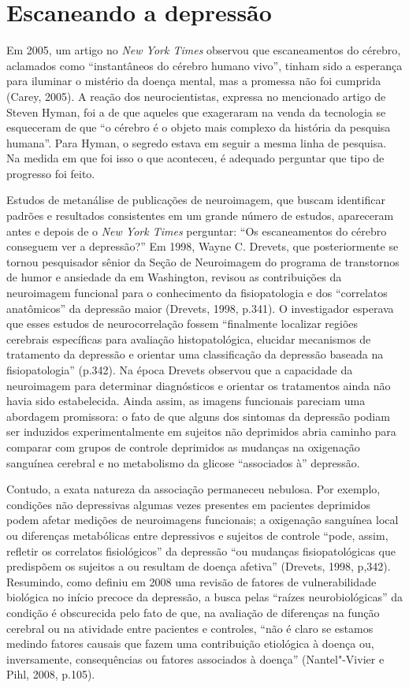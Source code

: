 \chapter{Escaneando a depressão}

Em 2005, um artigo no \emph{New York Times} observou que escaneamentos
do cérebro, aclamados como ``instantâneos do cérebro humano vivo'',
tinham sido a esperança para iluminar o mistério da doença mental, mas a
promessa não foi cumprida (Carey, 2005). A reação dos neurocientistas,
expressa no mencionado artigo de Steven Hyman, foi a de que aqueles que
exageraram na venda da tecnologia se esqueceram de que ``o cérebro é o
objeto mais complexo da história da pesquisa humana''. Para Hyman, o
segredo estava em seguir a mesma linha de pesquisa. Na medida em que foi
isso o que aconteceu, é adequado perguntar que tipo de progresso foi
feito.

Estudos de metanálise de publicações de neuroimagem, que buscam
identificar padrões e resultados consistentes em um grande número de
estudos, apareceram antes e depois de o \emph{New York Times} perguntar:
``Os escaneamentos do cérebro conseguem ver a depressão?'' Em 1998,
Wayne C. Drevets, que posteriormente se tornou pesquisador sênior da
Seção de Neuroimagem do programa de transtornos de humor e ansiedade da
 em Washington, revisou as contribuições da neuroimagem funcional
para o conhecimento da fisiopatologia e dos ``correlatos anatômicos'' da
depressão maior (Drevets, 1998, p.341). O investigador esperava que
esses estudos de neurocorrelação fossem ``finalmente localizar regiões
cerebrais específicas para avaliação histopatológica, elucidar
mecanismos de tratamento da depressão e orientar uma classificação da
depressão baseada na fisiopatologia'' (p.342). Na época Drevets observou
que a capacidade da neuroimagem para determinar diagnósticos e orientar
os tratamentos ainda não havia sido estabelecida. Ainda assim, as
imagens funcionais pareciam uma abordagem promissora: o fato de que
alguns dos sintomas da depressão podiam ser induzidos experimentalmente
em sujeitos não deprimidos abria caminho para comparar com grupos de
controle deprimidos as mudanças na oxigenação sanguínea cerebral e no
metabolismo da glicose ``associados à'' depressão.

Contudo, a exata natureza da associação permaneceu nebulosa. Por
exemplo, condições não depressivas algumas vezes presentes em pacientes
deprimidos podem afetar medições de neuroimagens funcionais; a
oxigenação sanguínea local ou diferenças metabólicas entre depressivos e
sujeitos de controle ``pode, assim, refletir os correlatos
fisiológicos'' da depressão ``ou mudanças fisiopatológicas que
predispõem os sujeitos a ou resultam de doença afetiva'' (Drevets, 1998,
p,342). Resumindo, como definiu em 2008 uma revisão de fatores de
vulnerabilidade biológica no início precoce da depressão, a busca pelas
``raízes neurobiológicas'' da condição é obscurecida pelo fato de que,
na avaliação de diferenças na função cerebral ou na atividade entre
pacientes e controles, ``não é claro se estamos medindo fatores causais
que fazem uma contribuição etiológica à doença ou, inversamente,
consequências ou fatores associados à doença'' (Nantel"-Vivier e Pihl,
2008, p.105).

